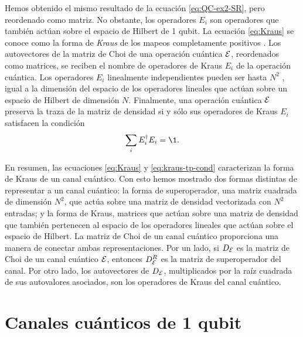Hemos obtenido el mismo resultado de la ecuación 
\eqref{eq:QC-ex2-SR}, pero reordenado como matriz. 
No obstante, los operadores $E_i$ son
operadores que también actúan sobre el espacio de Hilbert de 1 qubit. 
La ecuación \eqref{eq:Kraus} se conoce 
como la forma de \textit{Kraus} de los mapeos completamente positivos
\cite{bengtsson_zyczkowski_2017}.
Los autovectores de la matriz de Choi de una operación cuántica $\mathcal{E}$,
reordenados como matrices, se
reciben el nombre de operadores de Kraus $E_i$ de la operación cuántica.
Los operadores $E_i$ linealmente independientes  
pueden ser hasta $N^2$ \cite{nielsen_chuang_2011}, igual a la dimensión 
del espacio de los operadores lineales que actúan sobre un espacio de
Hilbert de dimensión $N$. 
Finalmente, una operación cuántica $\mathcal{E}$ preserva la traza de la matriz de densidad 
si y sólo sus operadores de Kraus $E_i$ satisfacen la condición
\cite{bengtsson_zyczkowski_2017}
\begin{align}
\sum_iE_i^{\dagger}E_i=\1.
\label{eq:kraus-tp-cond}
\end{align}

En resumen, las ecuaciones \eqref{eq:Kraus} y \eqref{eq:kraus-tp-cond}
caracterizan la forma de Kraus de un canal cuántico. 
Con esto hemos mostrado dos formas distintas de representar a un 
canal cuántico: la forma de superoperador, una matriz cuadrada
de dimensión $N^2$, que actúa sobre una matriz de densidad vectorizada 
con $N^2$ entradas; y la forma de Kraus, matrices que actúan sobre
una matriz de densidad que también pertenecen al espacio de 
los operadores lineales que actúan sobre el espacio de Hilbert. La matriz de 
Choi de un canal cuántico proporciona una manera de conectar ambas 
representaciones. Por un lado, si $D_{\mathcal{E}}$ es la matriz de Choi de un canal 
cuántico $\mathcal{E}$, entonces $D_{\mathcal{E}}^R$ es la matriz de superoperador
del canal.
Por otro lado, los autovectores de $D_{\mathcal{E}}$,
multiplicados por la raíz cuadrada de sus autovalores asociados,
son los operadores de Kraus del canal cuántico. 

\section{Canales cuánticos de 1 qubit} %

